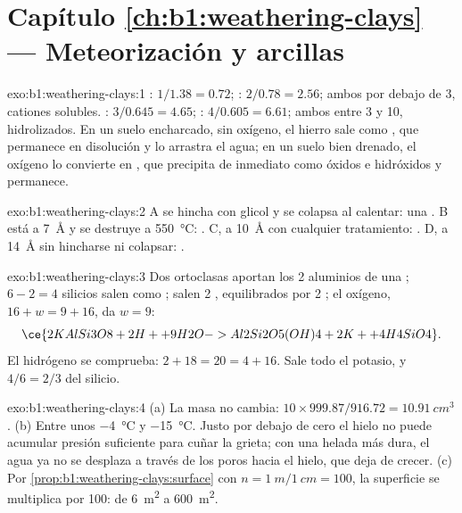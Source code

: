 \section*{Capítulo \ref{ch:b1:weathering-clays} --- Meteorización y arcillas}

\begin{solution}{exo:b1:weathering-clays:1}
: $1/1.38 = 0.72$; : $2/0.78 = 2.56$; ambos por debajo de 3, cationes solubles.
: $3/0.645 = 4.65$; : $4/0.605 = 6.61$; ambos entre 3 y 10, hidrolizados. En un suelo encharcado, sin oxígeno, el hierro
sale como , que permanece en disolución y lo arrastra el agua; en un suelo bien drenado, el oxígeno lo convierte en , que
precipita de inmediato como óxidos e hidróxidos y permanece.
\end{solution}

\begin{solution}{exo:b1:weathering-clays:2}
A se hincha con glicol y se colapsa al calentar: una . B está a \SI{7}{\angstrom} y se destruye a \SI{550}{\celsius}: .
C, a \SI{10}{\angstrom} con cualquier tratamiento: . D, a \SI{14}{\angstrom} sin hincharse ni colapsar: .
\end{solution}

\begin{solution}{exo:b1:weathering-clays:3}
Dos ortoclasas aportan los 2 aluminios de una ; $6 - 2 = 4$ silicios salen como ; salen 2 , equilibrados por 2 ; el oxígeno,
$16 + w = 9 + 16$, da $w = 9$:
\[
  \ce{2 KAlSi3O8 + 2 H+ + 9 H2O -> Al2Si2O5(OH)4 + 2 K+ + 4 H4SiO4}.
\]
El hidrógeno se comprueba: $2 + 18 = 20 = 4 + 16$. Sale todo el potasio, y $4/6 =
2/3$ del silicio.
\end{solution}

\begin{solution}{exo:b1:weathering-clays:4}
(a) La masa no cambia: $10 \times 999.87/916.72 = \qty{10.91}{cm^3}$.
(b) Entre unos \qty{-4}{\celsius} y \qty{-15}{\celsius}. Justo por debajo de cero el hielo no puede acumular presión suficiente para cuñar la grieta;
con una helada más dura, el agua ya no se desplaza a través de los poros hacia el hielo, que deja de crecer. (c) Por
\cref{prop:b1:weathering-clays:surface} con $n = \qty{1}{m}/\qty{1}{cm} = 100$,
la superficie se multiplica por 100: de \qty{6}{m^2} a \qty{600}{m^2}.
\end{solution}

